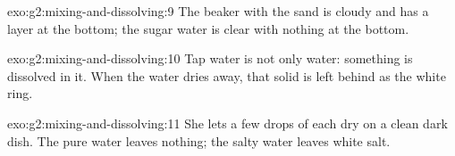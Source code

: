 \begin{solution}{exo:g2:mixing-and-dissolving:9}
The beaker with the sand is cloudy and has a layer at the bottom; the
sugar water is clear with nothing at the bottom.
\end{solution}

\begin{solution}{exo:g2:mixing-and-dissolving:10}
Tap water is not only water: something is dissolved in it. When the
water dries away, that solid is left behind as the white ring.
\end{solution}

\begin{solution}{exo:g2:mixing-and-dissolving:11}
She lets a few drops of each dry on a clean dark dish. The pure water
leaves nothing; the salty water leaves white salt.
\end{solution}
